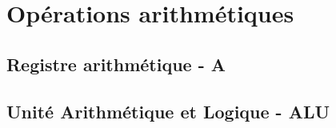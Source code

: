 \chapter{Opérations arithmétiques}	

\section{Registre arithmétique - A}

\section{Unité Arithmétique et Logique - ALU}
